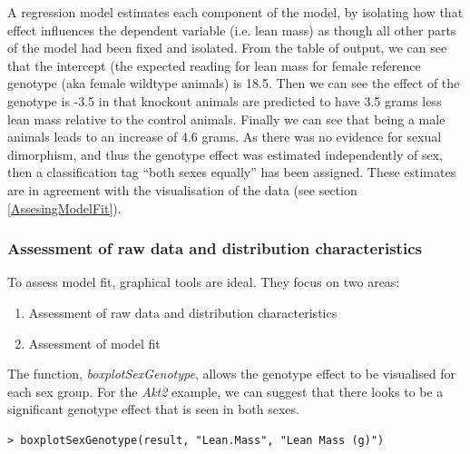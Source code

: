 \documentclass[12pt,a4paper]{article}
\begin{document}
A regression model estimates each component of the model, by isolating how that effect influences the dependent variable (i.e. lean mass) as though all other parts of the model had been fixed and isolated.   
From the table of output, we can see that the intercept (the expected reading for lean mass for female reference genotype (aka female wildtype animals) is 18.5.  
Then we can see the effect of the genotype is -3.5 in that knockout animals are predicted to have 3.5 grams less lean mass relative to the control animals.  
Finally we can see that being a male animals leads to an increase of 4.6 grams.  
As there was no evidence for sexual dimorphism, and thus the genotype effect was estimated independently of sex, then a classification tag “both sexes equally” has been assigned.  
These estimates are in agreement with the visualisation of the data (see section \ref{AssesingModelFit}). 

\subsubsection{Assessment of raw data and distribution characteristics}
To assess model fit, graphical tools are ideal.  They focus on two areas:
\begin{enumerate}
 \item Assessment of raw data and distribution characteristics
 \item Assessment of model fit
\end{enumerate}
\label{AssesingModelFit}

The function, \textit{boxplotSexGenotype}, allows the genotype effect to be visualised for each sex group. 
For the \textit{Akt2} example, we can suggest that there looks to be a significant genotype effect that is seen in both sexes. 


\begingroup
    \fontsize{8pt}{12pt}\selectfont
\begin{verbatim}
> boxplotSexGenotype(result, "Lean.Mass", "Lean Mass (g)")
\end{verbatim}
\endgroup 
\end{document}
